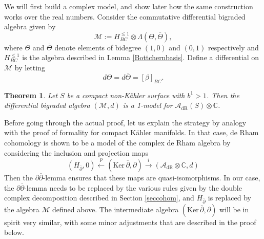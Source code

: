 \documentclass[a4paper]{amsart}
\newtheorem{theo}{Theorem}[section]
\theoremstyle{definition}
\newcommand{\CC}{\mathbb{C}}
\newcommand{\Aa}{\mathcal{A}}
\newcommand{\Mm}{\mathcal{M}}
\newcommand{\Ker}{\mathrm{Ker}\,}
\newcommand{\ov}{\overline}
\newcommand{\del}{\partial}
\newcommand{\delb}{{\overline\partial}}
\newcommand{\dR}{\mathrm{dR}}
\begin{document}
We will first build a complex model, and show later how the same construction works over the real numbers.
Consider the commutative differential bigraded algebra given by
\[\Mm:=H_{BC}^{\leq 1}\otimes\Lambda(\Theta,\ov \Theta),\]
where
$\Theta$ and $\ov \Theta$ denote elements of bidegree $(1,0)$ and $(0,1)$ respectively and
$H_{BC}^{\leq 1}$ is the algebra described in Lemma \ref{Bottchernbasis}.
Define a differential on $\Mm$ by letting
\[d\Theta=d\ov \Theta=[\beta]_{BC}.\]



\begin{theo}\label{theomodel}Let $S$ be a compact non-Kähler surface with $b^1>1$.
Then the differential bigraded algebra $(\Mm,d)$
is a 1-model for $\Aa_{\dR}(S)\otimes\CC$.
\end{theo}


Before going through the actual proof, let us explain the strategy by analogy with the proof of formality for compact Kähler manifolds. In that case, de Rham cohomology is shown to be a model of the complex de Rham algebra by considering the inclusion and projection maps
\[(H_\delb,0)\stackrel{p}{\longleftarrow}(\Ker \delb,\del)\stackrel{i}{\longrightarrow}(\Aa_{\dR}\otimes\CC,d)\]
Then the $\del\delb$-lemma ensures that these maps are quasi-isomorphisms.
In our case, the $\del\delb$-lemma needs to be replaced by the various rules given by the double complex decomposition described in Section \ref{seccohom}, and $H_{\delb}$ is replaced by the algebra $\Mm$ defined above.
The intermediate algebra $(\Ker \delb,\del)$ will be in spirit very similar, with some minor adjustments that are described in the proof below.
\end{document}
